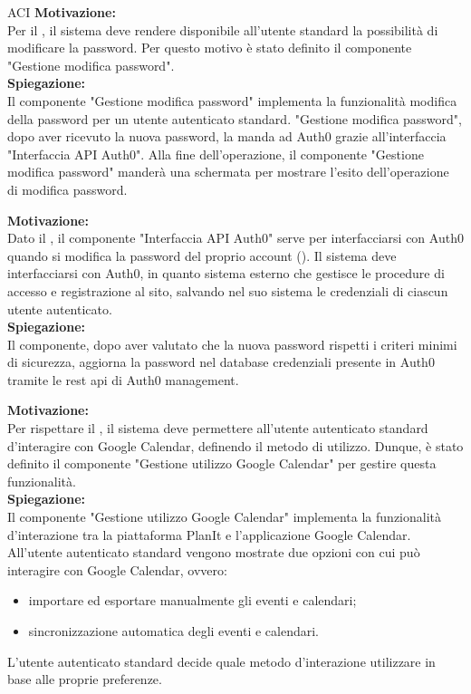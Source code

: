 \begin{listaPersonale}{ACI}
    \textbf{Motivazione:}\\
    Per il , il sistema deve rendere disponibile all'utente standard la possibilità di modificare la password. Per questo motivo è stato definito il componente "Gestione modifica password".\\
    \textbf{Spiegazione:}\\
    Il componente "Gestione modifica password" implementa la funzionalità modifica della password per un utente autenticato standard. "Gestione modifica password", dopo aver ricevuto la nuova password, la manda ad Auth0 grazie all'interfaccia "Interfaccia API Auth0". Alla fine dell'operazione, il componente "Gestione modifica password" manderà una schermata per mostrare l'esito dell'operazione di modifica password.


    \textbf{Motivazione:}\\
    Dato il , il componente "Interfaccia API Auth0" serve per interfacciarsi con Auth0 quando si modifica la password del proprio account (). Il sistema deve interfacciarsi con Auth0, in quanto sistema esterno che gestisce le procedure di accesso e registrazione al sito, salvando nel suo sistema le credenziali di ciascun utente autenticato.\\
    \textbf{Spiegazione:}\\
    Il componente, dopo aver valutato che la nuova password rispetti i criteri minimi di sicurezza, aggiorna la password nel database credenziali presente in Auth0 tramite le rest api di Auth0 management.


    \textbf{Motivazione:}\\
    Per rispettare il , il sistema deve permettere all'utente autenticato standard d'interagire con Google Calendar, definendo il metodo di utilizzo. Dunque, è stato definito il componente "Gestione utilizzo Google Calendar" per gestire questa funzionalità.\\
    \textbf{Spiegazione:}\\
    Il componente "Gestione utilizzo Google Calendar" implementa la funzionalità d'interazione tra la piattaforma PlanIt e l'applicazione Google Calendar. All'utente autenticato standard vengono mostrate due opzioni con cui può interagire con Google Calendar, ovvero:
    \begin{itemize}
        \item importare ed esportare manualmente gli eventi e calendari;
        \item sincronizzazione automatica degli eventi e calendari.
    \end{itemize}
    L'utente autenticato standard decide quale metodo d'interazione utilizzare in base alle proprie preferenze.



\end{listaPersonale}
